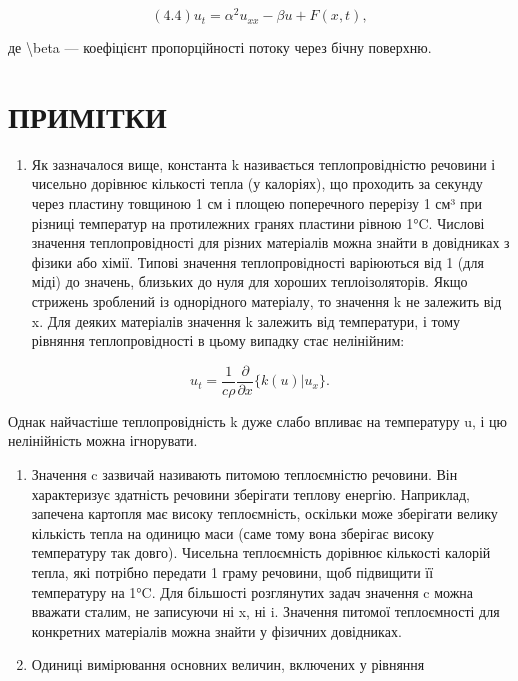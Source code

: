 \documentclass[
]{article}
\providecommand{\tightlist}{%
  \setlength{\itemsep}{0pt}\setlength{\parskip}{0pt}}
\begin{document}
\[
(4.4) u_t = \alpha^2 u_{xx} - \beta u + F(x, t),
\]

де \textbackslash beta --- коефіцієнт пропорційності потоку через бічну
поверхню.

\section{ПРИМІТКИ}\label{ux43fux440ux438ux43cux456ux442ux43aux438}

\begin{enumerate}
\def\labelenumi{\arabic{enumi}.}
\tightlist
\item
  Як зазначалося вище, константа k називається теплопровідністю речовини
  і чисельно дорівнює кількості тепла (у калоріях), що проходить за
  секунду через пластину товщиною 1 см і площею поперечного перерізу 1
  см³ при різниці температур на протилежних гранях пластини рівною 1°C.
  Числові значення теплопровідності для різних матеріалів можна знайти в
  довідниках з фізики або хімії. Типові значення теплопровідності
  варіюються від 1 (для міді) до значень, близьких до нуля для хороших
  теплоізоляторів. Якщо стрижень зроблений із однорідного матеріалу, то
  значення k не залежить від x. Для деяких матеріалів значення k
  залежить від температури, і тому рівняння теплопровідності в цьому
  випадку стає нелінійним:
\end{enumerate}

\[
u_{t} = \frac{1}{c\rho} \frac{\partial}{\partial x} \{ k (u) | u_{x} \}.
\]

Однак найчастіше теплопровідність k дуже слабо впливає на температуру u,
і цю нелінійність можна ігнорувати.

\begin{enumerate}
\def\labelenumi{\arabic{enumi}.}
\setcounter{enumi}{1}
\item
  Значення c зазвичай називають питомою теплоємністю речовини. Він
  характеризує здатність речовини зберігати теплову енергію. Наприклад,
  запечена картопля має високу теплоємність, оскільки може зберігати
  велику кількість тепла на одиницю маси (саме тому вона зберігає високу
  температуру так довго). Чисельна теплоємність дорівнює кількості
  калорій тепла, які потрібно передати 1 граму речовини, щоб підвищити
  її температуру на 1°C. Для більшості розглянутих задач значення c
  можна вважати сталим, не записуючи ні x, ні i. Значення питомої
  теплоємності для конкретних матеріалів можна знайти у фізичних
  довідниках.
\item
  Одиниці вимірювання основних величин, включених у рівняння
\end{enumerate}
\end{document}
